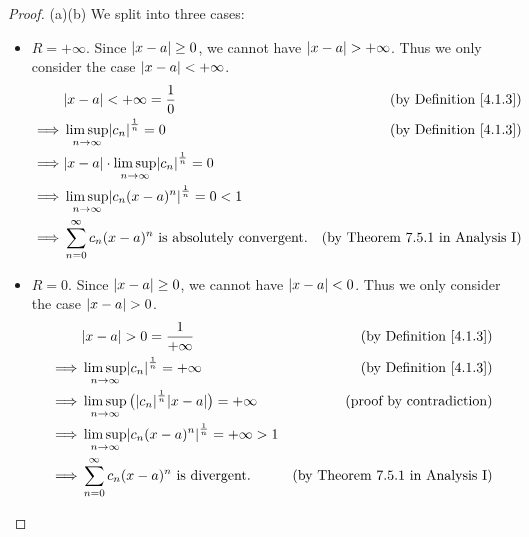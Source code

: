 \begin{proof}{(a)}{(b)}
    We split into three cases:
    \begin{itemize}
        \item \(R = +\infty\).
              Since \(\abs*{x - a} \geq 0\), we cannot have \(\abs*{x - a} > +\infty\).
              Thus we only consider the case \(\abs*{x - a} < +\infty\).
              \begin{align*}
                           & \abs*{x - a} < +\infty = \frac{1}{0}                                   & \text{(by Definition \ref{4.1.3})}      \\
                  \implies & \limsup_{n \to \infty} \abs*{c_n}^{\frac{1}{n}} = 0                    & \text{(by Definition \ref{4.1.3})}      \\
                  \implies & \abs*{x - a} \cdot \limsup_{n \to \infty} \abs*{c_n}^{\frac{1}{n}} = 0                                           \\
                  \implies & \limsup_{n \to \infty} \abs*{c_n (x - a)^n}^{\frac{1}{n}} = 0 < 1                                                \\
                  \implies & \sum_{n = 0}^\infty c_n (x - a)^n \text{ is absolutely convergent}.    & \text{(by Theorem 7.5.1 in Analysis I)}
              \end{align*}
        \item \(R = 0\).
              Since \(\abs*{x - a} \geq 0\), we cannot have \(\abs*{x - a} < 0\).
              Thus we only consider the case \(\abs*{x - a} > 0\).
              \begin{align*}
                           & \abs*{x - a} > 0 = \frac{1}{+\infty}                                             & \text{(by Definition \ref{4.1.3})}      \\
                  \implies & \limsup_{n \to \infty} \abs*{c_n}^{\frac{1}{n}} = +\infty                        & \text{(by Definition \ref{4.1.3})}      \\
                  \implies & \limsup_{n \to \infty} \big(\abs*{c_n}^{\frac{1}{n}} \abs*{x - a}\big) = +\infty & \text{(proof by contradiction)}         \\
                  \implies & \limsup_{n \to \infty} \abs*{c_n (x - a)^n}^{\frac{1}{n}} = +\infty > 1                                                    \\
                  \implies & \sum_{n = 0}^\infty c_n (x - a)^n \text{ is divergent}.                          & \text{(by Theorem 7.5.1 in Analysis I)}

\end{align*}
\end{itemize}
\end{proof}
